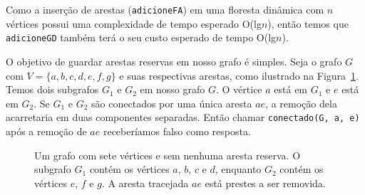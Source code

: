 Como a inserção de arestas (\texttt{adicioneFA}) em uma floresta dinâmica com $n$ vértices possui uma complexidade de tempo esperado O(lg$n$), então temos que \texttt{adicioneGD} também terá o seu custo esperado de tempo O(lg$n$). 

O objetivo de guardar arestas reservas em nosso grafo é simples. Seja o grafo $G$ com $V = \{a, b, c, d, e, f, g\}$ e suas respectivas arestas, como ilustrado na Figura~\ref{fig:graph_without_reserve_edges}. Temos dois subgrafos $G_1$ e $G_2$ em nosso grafo $G$. O vértice $a$ está em $G_1$ e $e$ está em $G_2$. Se $G_1$ e $G_2$ são conectados por uma única aresta $ae$, a remoção dela acarretaria em duas componentes separadas. Então chamar \texttt{conectado(G, a, e)} após a remoção de $ae$ receberíamos falso como resposta. 

\begin{figure}
    \centering
    \caption{Um grafo com sete vértices e sem nenhuma aresta reserva. O subgrafo $G_1$ contém os vértices $a$, $b$, $c$ e $d$, enquanto $G_2$ contém os vértices $e$, $f$ e $g$. A aresta tracejada $ae$ está prestes a ser removida.}
    \label{fig:graph_without_reserve_edges}
\end{figure}

